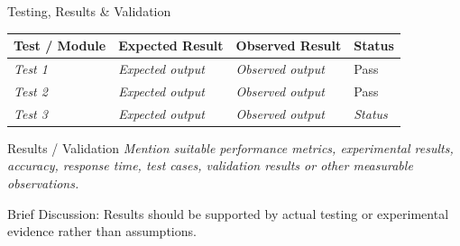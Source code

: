 \documentclass[aspectratio=169,11pt]{beamer}
\newcommand{\smallnote}[1]{%
\vspace{0.08cm}
{\scriptsize\color{GEUGrey}#1}
}
\newcommand{\placeholder}[1]{%
\textit{\color{GEUGrey}#1}
}
\begin{document}
\begin{frame}{Testing, Results \& Validation}

\scriptsize

\begin{center}

\renewcommand{\arraystretch}{1.3}

\begin{tabularx}{.96\textwidth}
{@{}p{2.1cm}X X p{1.4cm}@{}}

\toprule
Test / Module &
Expected Result &
Observed Result &
Status\\
\midrule

\placeholder{Test 1} &
\placeholder{Expected output} &
\placeholder{Observed output} &
Pass\\

\placeholder{Test 2} &
\placeholder{Expected output} &
\placeholder{Observed output} &
Pass\\

\placeholder{Test 3} &
\placeholder{Expected output} &
\placeholder{Observed output} &
\placeholder{Status}\\

\bottomrule

\end{tabularx}

\end{center}

\vspace{3mm}

\begin{block}{Results / Validation}
\placeholder{
Mention suitable performance metrics, experimental results,
accuracy, response time, test cases, validation results or
other measurable observations.
}
\end{block}

\smallnote{
Brief Discussion: Results should be supported by actual testing
or experimental evidence rather than assumptions.
}

\end{frame}
\end{document}
